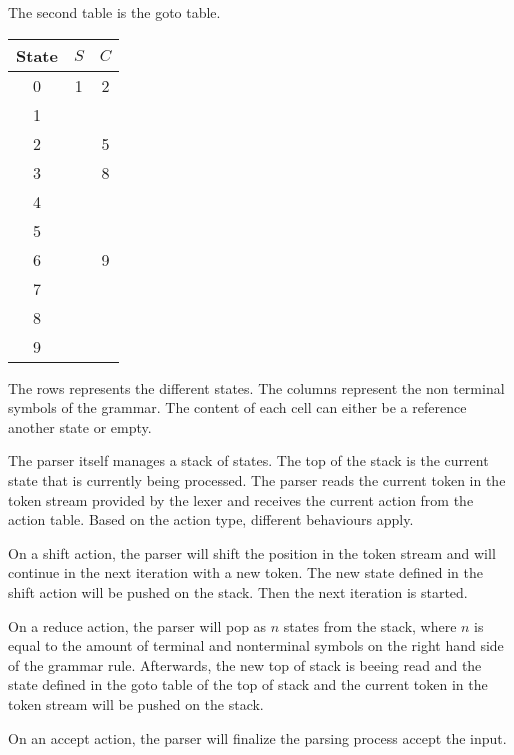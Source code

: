 The second table is the goto table. 

\begin{center}
\begin{tabular}{c|cc}
State & $S$ & $C$\\
\hline 
0 & 1 & 2\\
1 &    &     \\
2 &  & 5 \\
3 &  & 8  \\
4 &  &   \\
5 &  & \\
6 &  & 9 \\
7 &  & \\
8 &  &  \\
9 &  & 
\end{tabular} 
\end{center}

The rows represents the different states. The columns represent the non terminal symbols of the grammar. The content of each cell can either be a reference another state or empty.

The parser itself manages a stack of states. The top of the stack is the current state that is currently being processed. The parser reads the current token in the token stream provided by the lexer and receives the current action from the action table.
Based on the action type, different behaviours apply.

On a shift action, the parser will shift the position in the token stream and will continue in the next iteration with a new token. The new state defined in the shift action will be pushed on the stack. Then the next iteration is started.

On a reduce action, the parser will pop as $n$ states from the stack, where $n$ is equal to the amount of terminal and nonterminal symbols on the right hand side of the grammar rule. Afterwards, the new top of stack is beeing read and the state defined in the goto table of the top of stack and the current token in the token stream will be pushed on the stack.

On an accept action, the parser will finalize the parsing process accept the input. 
